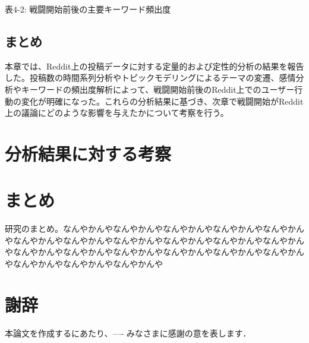 \documentclass[11pt, a4j]{jreport}
\begin{document}
    表4-2: 戦闘開始前後の主要キーワード頻出度

    \section{まとめ}
    本章では、Reddit上の投稿データに対する定量的および定性的分析の結果を報告した。投稿数の時間系列分析やトピックモデリングによるテーマの変遷、感情分析やキーワードの頻出度解析によって、戦闘開始前後のReddit上でのユーザー行動の変化が明確になった。これらの分析結果に基づき、次章で戦闘開始がReddit上の議論にどのような影響を与えたかについて考察を行う。

    \chapter{分析結果に対する考察}

    \chapter{まとめ}
    研究のまとめ。なんやかんやなんやかんやなんやかんやなんやかんやなんやかんやなんやかんやなんやかんやなんやかんやなんやかんやなんやかんやなんやかんやなんやかんやなんやかんやなんやかんやなんやかんやなんやかんやなんやかんやなんやかんやなんやかんやなんやかんや

    \chapter*{謝辞} %
    本論文を作成するにあたり、---- みなさまに感謝の意を表します．


    \renewcommand{\bibname}{参考文献} %
\end{document}
